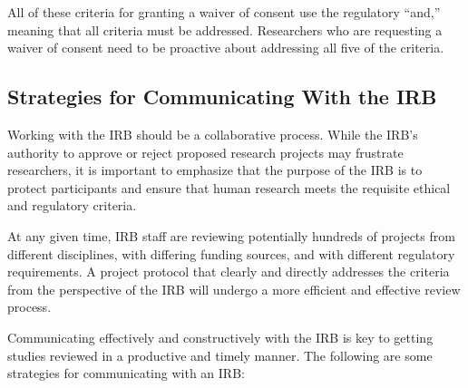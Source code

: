 \documentclass[
]{WileySix}
\begin{document}
All of these criteria for granting a waiver of consent use the regulatory ``and,'' meaning that all criteria must be addressed. Researchers who are requesting a waiver of consent need to be proactive about addressing all five of the criteria.

\hypertarget{strategies-for-communicating-with-the-irb}{%
\subsection{Strategies for Communicating With the IRB}\label{strategies-for-communicating-with-the-irb}}

Working with the IRB should be a collaborative process. While the IRB's authority to approve or reject proposed research projects may frustrate researchers, it is important to emphasize that the purpose of the IRB is to protect participants and ensure that human research meets the requisite ethical and regulatory criteria.

At any given time, IRB staff are reviewing potentially hundreds of projects from different disciplines, with differing funding sources, and with different regulatory requirements. A project protocol that clearly and directly addresses the criteria from the perspective of the IRB will undergo a more efficient and effective review process.

Communicating effectively and constructively with the IRB is key to getting studies reviewed in a productive and timely manner. The following are some strategies for communicating with an IRB:
\end{document}
